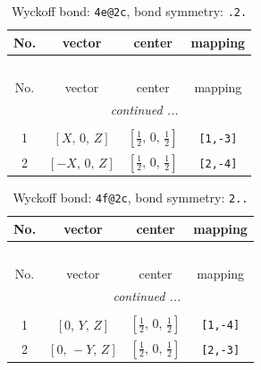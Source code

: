 \documentclass[fleqn,8pt]{jsarticle}
\begin{document}
\renewcommand{\arraystretch}{1.2}
\begin{longtable}{cccc}
\caption{Wyckoff bond: {\tt 4e@2c}, bond symmetry: {\tt .2.}}
 \\
 \hline \hline
No. & vector & center & mapping \\ \hline \endfirsthead

\multicolumn{3}{l}{\tablename\ \thetable{}} \\
 \hline \hline
No. & vector & center & mapping \\ \hline \endhead

 \hline \hline
\multicolumn{3}{r}{\footnotesize\it continued ...} \\ \endfoot

 \hline \hline
\multicolumn{3}{r}{} \\ \endlastfoot

1 & $\left[ X,\, 0,\, Z \right]$ & $\left[ \frac{1}{2},\, 0,\, \frac{1}{2} \right]$ & {\tt [1,-3]} \\ \hline
2 & $\left[ - X,\, 0,\, Z \right]$ & $\left[ \frac{1}{2},\, 0,\, \frac{1}{2} \right]$ & {\tt [2,-4]} \\
\end{longtable}
\renewcommand{\arraystretch}{1.2}
\begin{longtable}{cccc}
\caption{Wyckoff bond: {\tt 4f@2c}, bond symmetry: {\tt 2..}}
 \\
 \hline \hline
No. & vector & center & mapping \\ \hline \endfirsthead

\multicolumn{3}{l}{\tablename\ \thetable{}} \\
 \hline \hline
No. & vector & center & mapping \\ \hline \endhead

 \hline \hline
\multicolumn{3}{r}{\footnotesize\it continued ...} \\ \endfoot

 \hline \hline
\multicolumn{3}{r}{} \\ \endlastfoot

1 & $\left[ 0,\, Y,\, Z \right]$ & $\left[ \frac{1}{2},\, 0,\, \frac{1}{2} \right]$ & {\tt [1,-4]} \\ \hline
2 & $\left[ 0,\, - Y,\, Z \right]$ & $\left[ \frac{1}{2},\, 0,\, \frac{1}{2} \right]$ & {\tt [2,-3]} \\
\end{longtable}
\renewcommand{\arraystretch}{1.2}
\end{document}
